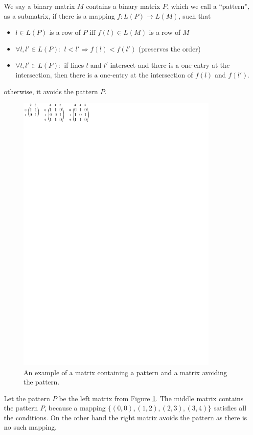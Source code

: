 We say a binary matrix $M$ contains a binary matrix $P$, which we call a ``pattern'', as a submatrix, if there is a mapping $f:L(P)\rightarrow L(M)$, such that
\begin{itemize}
\item $l\in L(P)$ is a row of $P$ iff $f(l)\in L(M)$ is a row of $M$
\item $\forall l,l'\in L(P):$ $l<l'\Rightarrow f(l)<f(l')$ (preserves the order)
\item $\forall l,l'\in L(P):$ if lines $l$ and $l'$ intersect and there is a one-entry at the intersection, then there is a one-entry at the intersection of $f(l)$ and $f(l')$.
\end{itemize}
otherwise, it avoids the pattern $P$.
\begin{figure}[h!]
\centering
\includegraphics[width=100mm]{../img/avoiding.pdf}
\caption{An example of a matrix containing a pattern and a matrix avoiding the pattern.}
\label{avoiding}
\end{figure}

Let the pattern $P$ be the left matrix from Figure \ref{avoiding}. The middle matrix contains the pattern $P$, because a mapping $\{(0,0),(1,2),(2,3),(3,4)\}$ satisfies all the conditions. On the other hand the right matrix avoids the pattern as there is no such mapping.

